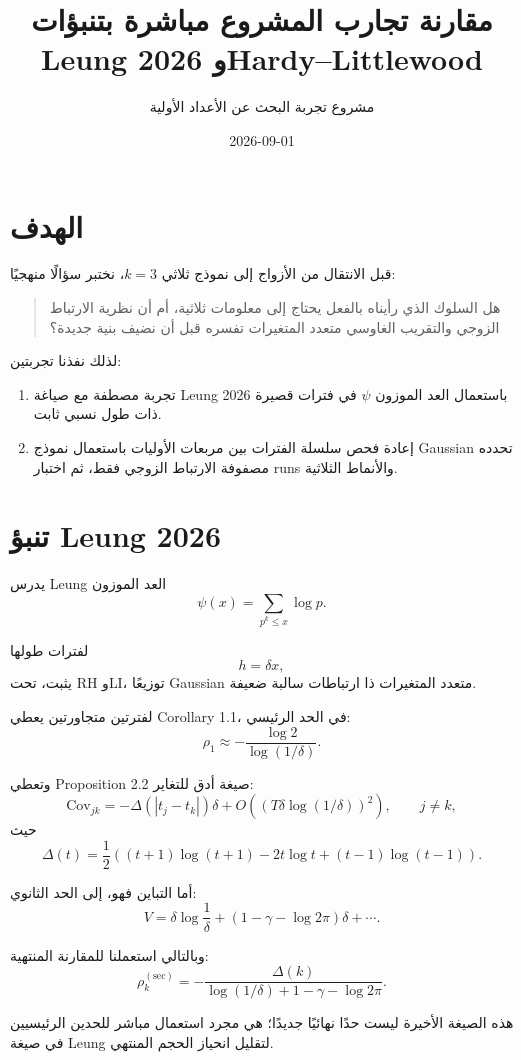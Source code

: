 \documentclass[12pt]{article}
\title{مقارنة تجارب المشروع مباشرة بتنبؤات Leung 2026 وHardy--Littlewood}
\author{مشروع تجربة البحث عن الأعداد الأولية}
\date{2026-09-01}
\begin{document}
\maketitle

\section{الهدف}

قبل الانتقال من الأزواج إلى نموذج ثلاثي \(k=3\)، نختبر سؤالًا منهجيًا:

\begin{quote}
هل السلوك الذي رأيناه بالفعل يحتاج إلى معلومات ثلاثية، أم أن نظرية الارتباط الزوجي والتقريب الغاوسي متعدد المتغيرات تفسره قبل أن نضيف بنية جديدة؟
\end{quote}

لذلك نفذنا تجربتين:

\begin{enumerate}
\item تجربة مصطفة مع صياغة Leung 2026 باستعمال العد الموزون
\(\psi\) في فترات قصيرة ذات طول نسبي ثابت.
\item إعادة فحص سلسلة الفترات بين مربعات الأوليات باستعمال نموذج Gaussian
تحدده مصفوفة الارتباط الزوجي فقط، ثم اختبار runs والأنماط الثلاثية.
\end{enumerate}

\section{تنبؤ Leung 2026}

يدرس Leung العد الموزون
\[
\psi(x)=\sum_{p^k\le x}\log p.
\]

لفترات طولها
\[
h=\delta x,
\]
يثبت، تحت RH وLI، توزيعًا Gaussian متعدد المتغيرات ذا ارتباطات سالبة ضعيفة.

لفترتين متجاورتين يعطي Corollary 1.1، في الحد الرئيسي:
\[
\rho_1
\approx
-\frac{\log 2}{\log(1/\delta)}.
\]

وتعطي Proposition 2.2 صيغة أدق للتغاير:
\[
\mathrm{Cov}_{jk}
=
-\Delta(|t_j-t_k|)\delta
+
O\!\left((T\delta\log(1/\delta))^2\right),
\qquad j\ne k,
\]
حيث
\[
\Delta(t)
=
\frac12\left(
(t+1)\log(t+1)
-2t\log t
+(t-1)\log(t-1)
\right).
\]

أما التباين فهو، إلى الحد الثانوي:
\[
V
=
\delta\log\frac1\delta
+
(1-\gamma-\log2\pi)\delta
+\cdots.
\]

وبالتالي استعملنا للمقارنة المنتهية:
\[
\rho_k^{(\mathrm{sec})}
=
-\frac{\Delta(k)}
{\log(1/\delta)+1-\gamma-\log2\pi}.
\]

هذه الصيغة الأخيرة ليست حدًا نهائيًا جديدًا؛ هي مجرد استعمال مباشر للحدين
الرئيسيين في صيغة Leung لتقليل انحياز الحجم المنتهي.
\end{document}
